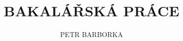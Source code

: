 \documentclass{bakalarka}
\author{PETR BARBORKA}
\title{BAKALÁŘSKÁ PRÁCE}
\begin{document}
\pagestyle{fancy}
\renewcommand{\chaptermark}[1]{\markboth{\textit{#1}}{}}
\renewcommand{\sectionmark}[1]{\markright{\textit{#1}}{}}
\cfoot{\thepage}
\lhead{\leftmark}
\rhead{\rightmark}
\maketitle
\end{document}
